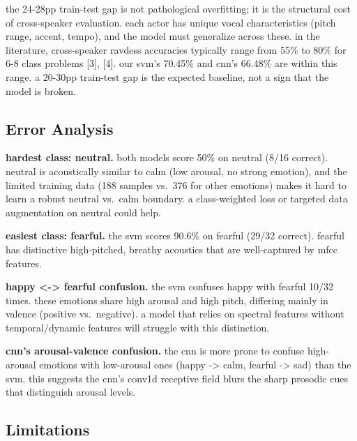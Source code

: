 \documentclass[conference]{IEEEtran}
\begin{document}
{the 24-28pp train-test gap is not pathological overfitting; it is the
structural cost of cross-speaker evaluation. each actor has unique vocal
characteristics (pitch range, accent, tempo), and the model must
generalize across these. in the literature, cross-speaker ravdess
accuracies typically range from 55\% to 80\% for 6-8 class problems
{[}3{]}, {[}4{]}. our svm's 70.45\% and cnn's 66.48\% are within this
range. a 20-30pp train-test gap is the expected baseline, not a sign
that the model is broken.

\subsection{Error Analysis}\label{error-analysis}

\textbf{hardest class: neutral.} both models score 50\% on neutral (8/16
correct). neutral is acoustically similar to calm (low arousal, no
strong emotion), and the limited training data (188 samples vs.~376 for
other emotions) makes it hard to learn a robust neutral vs.~calm
boundary. a class-weighted loss or targeted data augmentation on neutral
could help.

\textbf{easiest class: fearful.} the svm scores 90.6\% on fearful (29/32
correct). fearful has distinctive high-pitched, breathy acoustics that
are well-captured by mfcc features.

\textbf{happy \textless-\textgreater{} fearful confusion.} the svm
confuses happy with fearful 10/32 times. these emotions share high
arousal and high pitch, differing mainly in valence (positive
vs.~negative). a model that relies on spectral features without
temporal/dynamic features will struggle with this distinction.

\textbf{cnn's arousal-valence confusion.} the cnn is more prone to
confuse high-arousal emotions with low-arousal ones (happy
-\textgreater{} calm, fearful -\textgreater{} sad) than the svm. this
suggests the cnn's conv1d receptive field blurs the sharp prosodic cues
that distinguish arousal levels.

\subsection{Limitations}\label{limitations}

}
\end{document}
